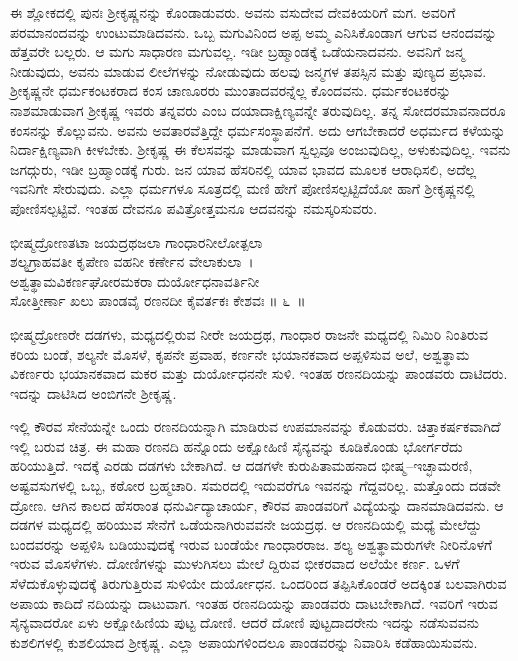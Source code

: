 ಈ ಶ್ಲೋಕದಲ್ಲಿ ಪುನಃ ಶ‍್ರೀಕೃಷ್ಣನನ್ನು ಕೊಂಡಾಡುವರು. ಅವನು ವಸುದೇವ ದೇವಕಿಯರಿಗೆ ಮಗ. ಅವರಿಗೆ ಪರಮಾನಂದವನ್ನು ಉಂಟುಮಾಡಿದವನು. ಒಬ್ಬ ಮಗುವಿನಿಂದ ಅಪ್ಪ ಅಮ್ಮ ಎನಿಸಿಕೊಂಡಾಗ ಆಗುವ ಆನಂದವನ್ನು ಹೆತ್ತವರೇ ಬಲ್ಲರು. ಆ ಮಗು ಸಾಧಾರಣ ಮಗುವಲ್ಲ. ಇಡೀ ಬ್ರಹ್ಮಾಂಡಕ್ಕೆ ಒಡೆಯನಾದವನು. ಅವನಿಗೆ ಜನ್ಮ ನೀಡುವುದು, ಅವನು ಮಾಡುವ ಲೀಲೆಗಳನ್ನು ನೋಡುವುದು ಹಲವು ಜನ್ಮಗಳ ತಪಸ್ಸಿನ ಮತ್ತು ಪುಣ್ಯದ ಪ್ರಭಾವ. ಶ‍್ರೀಕೃಷ್ಣನೇ ಧರ್ಮಕಂಟಕರಾದ ಕಂಸ ಚಾಣೂರರು ಮುಂತಾದವರನ್ನೆಲ್ಲ ಕೊಂದವನು. ಧರ್ಮಕಂಟಕರನ್ನು ನಾಶಮಾಡುವಾಗ ಶ‍್ರೀಕೃಷ್ಣ ಇವರು ತನ್ನವರು ಎಂಬ ದಯಾದಾಕ್ಷಿಣ್ಯವನ್ನೇ ತರುವುದಿಲ್ಲ. ತನ್ನ ಸೋದರಮಾವನಾದರೂ ಕಂಸನನ್ನು ಕೊಲ್ಲುವನು. ಅವನು ಅವತಾರವೆತ್ತಿದ್ದೇ ಧರ್ಮಸಂಸ್ಥಾಪನೆಗೆ. ಅದು ಆಗಬೇಕಾದರೆ ಅಧರ್ಮದ ಕಳೆಯನ್ನು ನಿರ್ದಾಕ್ಷಿಣ್ಯವಾಗಿ ಕೀಳಬೇಕು. ಶ‍್ರೀಕೃಷ್ಣ ಈ ಕೆಲಸವನ್ನು ಮಾಡುವಾಗ ಸ್ವಲ್ಪವೂ ಅಂಜುವುದಿಲ್ಲ, ಅಳುಕುವುದಿಲ್ಲ. ಇವನು ಜಗದ್ಗುರು, ಇಡೀ ಬ್ರಹ್ಮಾಂಡಕ್ಕೆ ಗುರು. ಜನ ಯಾವ ಹೆಸರಿನಲ್ಲಿ ಯಾವ ಭಾವದ ಮೂಲಕ ಆರಾಧಿಸಲಿ, ಅದೆಲ್ಲ ಇವನಿಗೇ ಸೇರುವುದು. ಎಲ್ಲಾ ಧರ್ಮಗಳೂ ಸೂತ್ರದಲ್ಲಿ ಮಣಿ ಹೇಗೆ ಪೋಣಿಸಲ್ಪಟ್ಟಿದೆಯೋ ಹಾಗೆ ಶ‍್ರೀಕೃಷ್ಣನಲ್ಲಿ ಪೋಣಿಸಲ್ಪಟ್ಟಿವೆ. ಇಂತಹ ದೇವನೂ ಪವಿತ್ರೋತ್ತಮನೂ ಆದವನನ್ನು ನಮಸ್ಕರಿಸುವರು.

\begin{shloka}
ಭೀಷ್ಮದ್ರೋಣತಟಾ ಜಯದ್ರಥಜಲಾ ಗಾಂಧಾರನೀಲೋತ್ಪಲಾ\\ಶಲ್ಯಗ್ರಾಹವತೀ ಕೃಪೇಣ ವಹನೀ ಕರ್ಣೇನ ವೇಲಾಕುಲಾ~।\\ಅಶ್ವತ್ಥಾಮವಿಕರ್ಣಘೋರಮಕರಾ ದುರ್ಯೋಧನಾವರ್ತಿನೀ\\ಸೋತ್ತೀರ್ಣಾ ಖಲು ಪಾಂಡವೈ ರಣನದೀ ಕೈವರ್ತಕಃ ಕೇಶವಃ \hfill॥ ೬~॥
\end{shloka}

\begin{artha}
ಭೀಷ್ಮದ್ರೋಣರೇ ದಡಗಳು, ಮಧ್ಯದಲ್ಲಿರುವ ನೀರೇ ಜಯದ್ರಥ, ಗಾಂಧಾರ ರಾಜನೇ ಮಧ್ಯದಲ್ಲಿ ನಿಮಿರಿ ನಿಂತಿರುವ ಕರಿಯ ಬಂಡೆ, ಶಲ್ಯನೇ ಮೊಸಳೆ, ಕೃಪನೇ ಪ್ರವಾಹ, ಕರ್ಣನೇ ಭಯಾನಕವಾದ ಅಪ್ಪಳಿಸುವ ಅಲೆ, ಅಶ್ವತ್ಥಾಮ ವಿಕರ್ಣರು ಭಯಾನಕವಾದ ಮಕರ ಮತ್ತು ದುರ್ಯೋಧನನೇ ಸುಳಿ. ಇಂತಹ ರಣನದಿಯನ್ನು ಪಾಂಡವರು ದಾಟಿದರು. ಇದನ್ನು ದಾಟಿಸಿದ ಅಂಬಿಗನೇ ಶ‍್ರೀಕೃಷ್ಣ.
\end{artha}

ಇಲ್ಲಿ ಕೌರವ ಸೇನೆಯನ್ನೇ ಒಂದು ರಣನದಿಯನ್ನಾಗಿ ಮಾಡಿರುವ ಉಪಮಾನವನ್ನು ಕೊಡುವರು. ಚಿತ್ತಾಕರ್ಷಕವಾಗಿದೆ ಇಲ್ಲಿ ಬರುವ ಚಿತ್ರ. ಈ ಮಹಾ ರಣನದಿ ಹನ್ನೊಂದು ಅಕ್ಷೋಹಿಣಿ ಸೈನ್ಯವನ್ನು ಕೂಡಿಕೊಂಡು ಭೋರ್ಗರೆದು ಹರಿಯುತ್ತಿದೆ. ಇದಕ್ಕೆ ಎರಡು ದಡಗಳು ಬೇಕಾಗಿದೆ. ಆ ದಡಗಳೇ ಕುರುಪಿತಾಮಹನಾದ ಭೀಷ್ಮ–ಇಚ್ಛಾಮರಣಿ, ಅಷ್ಟವಸುಗಳಲ್ಲಿ ಒಬ್ಬ, ಕಠೋರ ಬ್ರಹ್ಮಚಾರಿ. ಸಮರದಲ್ಲಿ ಇದುವರೆಗೂ ಇವನನ್ನು ಗೆದ್ದವರಿಲ್ಲ. ಮತ್ತೊಂದು ದಡವೇ ದ್ರೋಣ. ಆಗಿನ ಕಾಲದ ಹೆಸರಾಂತ ಧನುರ್ವಿದ್ಯಾಚಾರ್ಯ, ಕೌರವ ಪಾಂಡವರಿಗೆ ವಿದ್ಯೆಯನ್ನು ದಾನ\-ಮಾಡಿದವನು. ಆ ದಡಗಳ ಮಧ್ಯದಲ್ಲಿ ಹರಿಯುವ ಸೇನೆಗೆ ಒಡೆಯನಾಗಿರುವವನೇ ಜಯದ್ರಥ. ಆ ರಣನದಿಯಲ್ಲಿ ಮಧ್ಯೆ ಮೇಲೆದ್ದು ಬಂದವರನ್ನು ಅಪ್ಪಳಿಸಿ ಬಡಿಯುವುದಕ್ಕೆ ಇರುವ ಬಂಡೆಯೇ ಗಾಂಧಾರರಾಜ. ಶಲ್ಯ ಅಶ್ವತ್ಥಾಮರುಗಳೇ ನೀರಿನೊಳಗೆ ಇರುವ ಮೊಸಳೆಗಳು. ದೋಣಿಗಳನ್ನು ಮುಳುಗಿಸಲು ಮೇಲೆ ದ್ದಿರುವ ಭೀಕರವಾದ ಅಲೆಯೇ ಕರ್ಣ. ಒಳಗೆ ಸೆಳೆದುಕೊಳ್ಳುವುದಕ್ಕೆ ತಿರುಗುತ್ತಿರುವ ಸುಳಿಯೇ ದುರ್ಯೋಧನ. ಒಂದರಿಂದ ತಪ್ಪಿಸಿಕೊಂಡರೆ ಅದಕ್ಕಿಂತ ಬಲವಾಗಿರುವ ಅಪಾಯ ಕಾದಿದೆ ನದಿಯನ್ನು ದಾಟುವಾಗ. ಇಂತಹ ರಣನದಿಯನ್ನು ಪಾಂಡವರು ದಾಟಬೇಕಾಗಿದೆ. ಇವರಿಗೆ ಇರುವ ಸೈನ್ಯವಾದರೋ ಏಳು ಅಕ್ಷೋಹಿಣಿಯ ಪುಟ್ಟ ದೋಣಿ. ಆದರೆ ದೋಣಿ ಪುಟ್ಟದಾದರೇನು ಇದನ್ನು ನಡೆಸುವವನು ಕುಶಲಿಗಳಲ್ಲಿ ಕುಶಲಿಯಾದ ಶ‍್ರೀಕೃಷ್ಣ. ಎಲ್ಲಾ ಅಪಾಯಗಳಿಂದಲೂ ಪಾಂಡವರನ್ನು ನಿವಾರಿಸಿ ಕಡೆಹಾಯಿಸುವನು.

